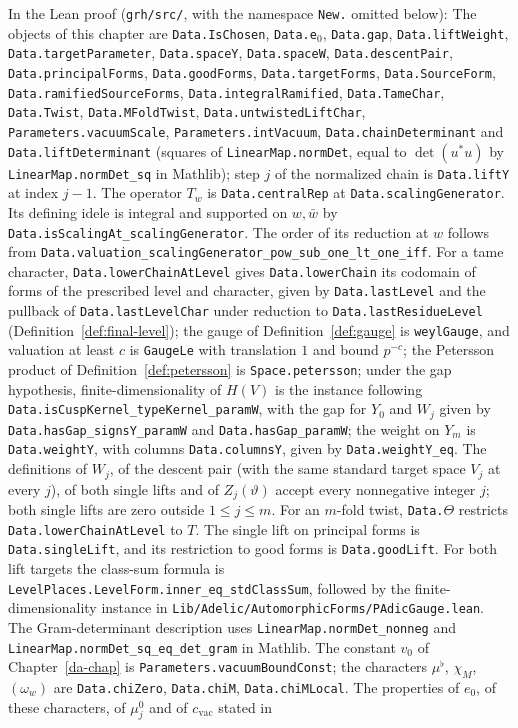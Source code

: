 \documentclass[reqno]{amsart}
\newcounter{chap}
\theoremstyle{plain}
\theoremstyle{definition}
\begin{document}
\begin{sloppypar}
In the Lean proof \cite{GL} (\texttt{grh/src/}, with the namespace \texttt{New.} omitted below): The objects of this chapter are \texttt{Data.IsChosen}, \texttt{Data.e\(_0\)}, \texttt{Data.gap}, \texttt{Data.liftWeight}, \texttt{Data.targetParameter}, \texttt{Data.spaceY}, \texttt{Data.spaceW}, \texttt{Data.descentPair}, \texttt{Data.principalForms}, \texttt{Data.goodForms}, \texttt{Data.targetForms}, \texttt{Data.SourceForm}, \texttt{Data.ramifiedSourceForms}, \texttt{Data.integralRamified}, \texttt{Data.TameChar}, \texttt{Data.Twist}, \texttt{Data.MFoldTwist}, \texttt{Data.untwistedLiftChar}, \texttt{Parameters.vacuumScale}, \texttt{Parameters.intVacuum}, \texttt{Data.chainDeterminant} and \texttt{Data.liftDeterminant} (squares of \texttt{LinearMap.normDet}, equal to \(\det(u^*u)\) by \texttt{LinearMap.normDet\_sq} in Mathlib); step \(j\) of the normalized chain is \texttt{Data.liftY} at index \(j-1\).  The operator \(T_w\) is \texttt{Data.centralRep} at \texttt{Data.scalingGenerator}.  Its defining idele is integral and supported on \(w,\bar w\) by \texttt{Data.isScalingAt\_scalingGenerator}.  The order of its reduction at \(w\) follows from \texttt{Data.valuation\_scalingGenerator\_pow\_sub\_one\_lt\_one\_iff}.  For a tame character, \texttt{Data.lowerChainAtLevel} gives \texttt{Data.lowerChain} its codomain of forms of the prescribed level and character, given by \texttt{Data.lastLevel} and the pullback of \texttt{Data.lastLevelChar} under reduction to \texttt{Data.lastResidueLevel} (Definition~\ref{def:final-level}); the gauge of Definition~\ref{def:gauge} is \texttt{weylGauge}, and valuation at least \(c\) is \texttt{GaugeLe} with translation \(1\) and bound \(p^{-c}\); the Petersson product of Definition~\ref{def:petersson} is \texttt{Space.petersson}; under the gap hypothesis, finite-dimensionality of \(H(V)\) is the instance following \texttt{Data.isCuspKernel\_typeKernel\_paramW}, with the gap for \(Y_0\) and \(W_j\) given by \texttt{Data.hasGap\_signsY\_paramW} and \texttt{Data.hasGap\_paramW}; the weight on \(Y_m\) is \texttt{Data.weightY}, with columns \texttt{Data.columnsY}, given by \texttt{Data.weightY\_eq}.  The definitions of \(W_j\), of the descent pair (with the same standard target space \(V_j\) at every \(j\)), of both single lifts and of \(Z_j(\vartheta)\) accept every nonnegative integer \(j\); both single lifts are zero outside \(1 \le j \le m\).  For an \(m\)-fold twist, \texttt{Data.\(\Theta\)} restricts \texttt{Data.lowerChainAtLevel} to \(T\).  The single lift on principal forms is \texttt{Data.singleLift}, and its restriction to good forms is \texttt{Data.goodLift}.  For both lift targets the class-sum formula is \texttt{LevelPlaces.LevelForm.inner\_eq\_stdClassSum}, followed by the finite-dimensionality instance in \texttt{Lib/Adelic/AutomorphicForms/PAdicGauge.lean}.  The Gram-determinant description uses \texttt{LinearMap.normDet\_nonneg} and \texttt{LinearMap.normDet\_sq\_eq\_det\_gram} in Mathlib.  The constant \(v_0\) of Chapter~\ref{da-chap} is \texttt{Parameters.vacuumBoundConst}; the characters \(\mu^\flat\), \(\chi_M\), \((\omega_w)\) are \texttt{Data.chiZero}, \texttt{Data.chiM}, \texttt{Data.chiMLocal}.  The properties of \(e_0\), of these characters, of \(\mu_j^0\) and of \(c_{\mathrm{vac}}\) stated in 
\end{sloppypar}
\end{document}
